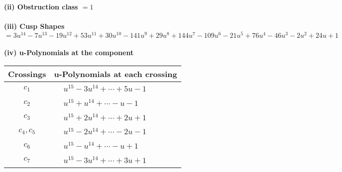 \documentclass[1p]{elsarticle_modified}
\theoremstyle{definition}
\begin{document}
\flushleft \textbf{(ii) Obstruction class $= 1$}\\~\\
\flushleft \textbf{(iii) Cusp Shapes $= 3 u^{14}-7 u^{13}-19 u^{12}+53 u^{11}+30 u^{10}-141 u^9+29 u^8+144 u^7-109 u^6-21 u^5+76 u^4-46 u^3-2 u^2+24 u+1$}\\~\\
\newpage\renewcommand{\arraystretch}{1}
\flushleft \textbf{(iv) u-Polynomials at the component}\newline \\
\begin{tabular}{m{50pt}|m{274pt}}
Crossings & \hspace{64pt}u-Polynomials at each crossing \\
\hline $$\begin{aligned}c_{1}\end{aligned}$$&$\begin{aligned}
&u^{15}-3 u^{14}+\cdots+5 u-1
\end{aligned}$\\
\hline $$\begin{aligned}c_{2}\end{aligned}$$&$\begin{aligned}
&u^{15}+u^{14}+\cdots- u-1
\end{aligned}$\\
\hline $$\begin{aligned}c_{3}\end{aligned}$$&$\begin{aligned}
&u^{15}+2 u^{14}+\cdots+2 u+1
\end{aligned}$\\
\hline $$\begin{aligned}c_{4},c_{5}\end{aligned}$$&$\begin{aligned}
&u^{15}-2 u^{14}+\cdots-2 u-1
\end{aligned}$\\
\hline $$\begin{aligned}c_{6}\end{aligned}$$&$\begin{aligned}
&u^{15}- u^{14}+\cdots- u+1
\end{aligned}$\\
\hline $$\begin{aligned}c_{7}\end{aligned}$$&$\begin{aligned}
&u^{15}-3 u^{14}+\cdots+3 u+1
\end{aligned}$\\

\end{tabular}
\end{document}
